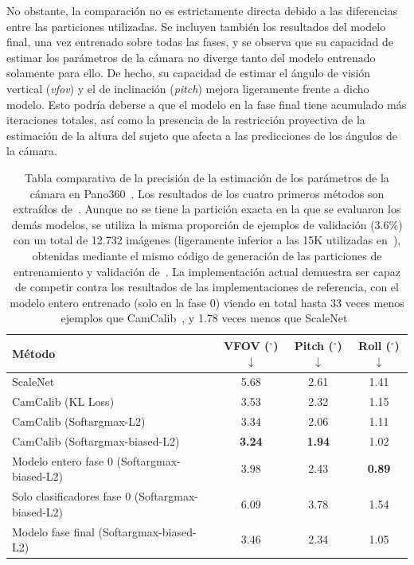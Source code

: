 No obstante, la comparación no es estrictamente directa debido a las diferencias entre las particiones utilizadas.
Se incluyen también los resultados del modelo final, una vez entrenado sobre todas las fases, y se observa
que su capacidad de estimar los parámetros de la cámara no diverge tanto del modelo entrenado solamente para
ello. De hecho, su capacidad de estimar el ángulo de visión vertical (\emph{vfov}) y el de inclinación (\emph{pitch})
mejora ligeramente frente a dicho modelo.
Esto podría deberse a que el modelo en la fase final tiene acumulado más iteraciones totales, así como
la presencia de la restricción proyectiva de la estimación de la altura del sujeto que afecta a las predicciones
de los ángulos de la cámara.

\begin{table}[!ht]
  \centering
  \scriptsize
  \begin{tabular}{|l|c|c|c|}
  \hline
  \rowcolor[HTML]{FFCB2F}
  \textbf{Método} & \textbf{VFOV ($^\circ$)$\downarrow$} & \textbf{Pitch ($^\circ$)$\downarrow$} & \textbf{Roll ($^\circ$)$\downarrow$} \\
  \hline
  ScaleNet~\cite{SVMIW} & 5.68 & 2.61 & 1.41 \\
  \hline
  CamCalib (KL Loss)~\cite{SPEC} & 3.53 & 2.32 & 1.15 \\
  \hline
  CamCalib (Softargmax-L2)~\cite{SPEC} & 3.34 & 2.06 & 1.11 \\
  \hline
  CamCalib (Softargmax-biased-L2)~\cite{SPEC} & \textbf{3.24} & \textbf{1.94} & 1.02 \\
  \hline
  Modelo entero fase 0 (Softargmax-biased-L2) & 3.98 & 2.43 & \textbf{0.89} \\
  \hline
  Solo clasificadores fase 0 (Softargmax-biased-L2) & 6.09 & 3.78 & 1.54 \\
  \hline
  Modelo fase final (Softargmax-biased-L2) & 3.46 & 2.34 & 1.05 \\
  \hline
  \end{tabular}
  \caption[Tabla comparativa de la precisión de la estimación de los parámetros de la cámara en Pano360~\cite{SPEC}.]
  {
    Tabla comparativa de la precisión de la estimación de los parámetros de la cámara en Pano360~\cite{SPEC}.
    Los resultados de los cuatro primeros métodos son extraídos de~\cite{SPEC}. Aunque no se tiene la partición exacta en la que se
    evaluaron los demás modelos, se utiliza la misma proporción de ejemplos de validación (3.6\%) con un total de 12.732 imágenes (ligeramente inferior a las 15K utilizadas en~\cite{SPEC}),
    obtenidas mediante el mismo código de generación de las particiones de entrenamiento y validación de~\cite{SPEC}.
    La implementación actual demuestra ser capaz de competir contra los resultados de las implementaciones de referencia,
    con el modelo entero entrenado (solo en la fase 0)
    viendo en total hasta 33 veces menos ejemplos que CamCalib~\cite{SPEC}, y 1.78 veces menos que ScaleNet~\cite{SVMIW}
}\label{tab:CalibResults}
\end{table}

